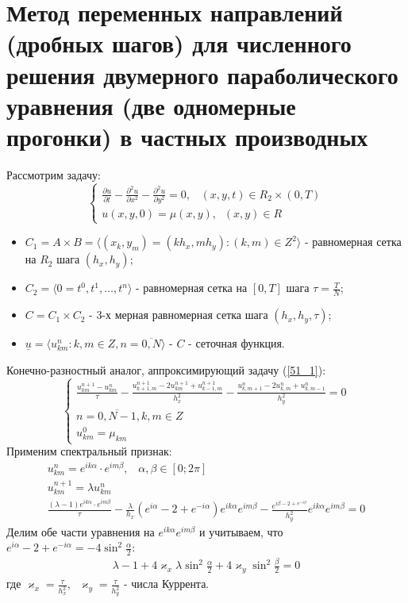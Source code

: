 \documentclass[__main__.tex]{subfiles}
\begin{document}
\section{Метод переменных направлений (дробных шагов) для численного решения двумерного параболического уравнения (две одномерные прогонки) в частных производных}

Рассмотрим задачу:
\begin{equation}
	\label{51_1}
	\begin{cases}
		\frac{\partial u}{\partial t}-\frac{\partial^2u}{\partial x^2}-\frac{\partial^2u}{\partial y^2} = 0,\;\;\;(x,y,t)\in R_2\times (0,T)\\
		u(x,y,0) = \mu(x,y),\;\;(x,y)\in R
	\end{cases}
\end{equation}
\begin{itemize}
	\item $C_1 = A\times B = \langle(x_k,y_m) = (kh_x,mh_y):(k,m)\in Z^2\rangle$ - равномерная сетка на $R_2$ шага $(h_x,h_y)$;
	\item $C_2 = \langle 0 = t^0,t^1,\dots,t^n\rangle$ - равномерная сетка на $[0,T]$ шага $\tau = \frac{T}{N}$;
	\item $C = C_1\times C_2$ - 3-х мерная равномерная сетка шага $(h_x,h_y,\tau)$;
	\item $\underline{u} = \langle u_{km}^n:k,m\in Z, n = \overline{0,N}\rangle$ - $C$ - сеточная функция.
\end{itemize} 
Конечно-разностный аналог, аппроксимирующий задачу (\ref{51_1}):
\begin{equation*}
	\begin{cases}
		\frac{u_{km}^{n+1}-u^n_{km}}{\tau}-\frac{u^{n+1}_{k+1,m}-2u_{km}^{n+1}+u_{k-1,m}^{n+1}}{h^2_x}-\frac{u^n_{k,m+1}-2u^n_{k,m}+u^n_{k,m-1}}{h^2_y} = 0\\
		n = \overline{0,N-1}, k,m\in Z\\
		u^0_{km} = \mu_{km}
	\end{cases}
\end{equation*}
Применим спектральный признак:
\begin{gather*}
	u^n_{km} = e^{ik\alpha}\cdot e^{im\beta},\;\;\;\alpha,\beta\in[0;2\pi]\\
	u_{km}^{n+1} = \lambda u^n_{km}\\
	\frac{(\lambda-1)e^{ik\alpha}\cdot e^{im\beta}}{\tau}-\frac{\lambda}{h_x}\left(e^{i\alpha}-2+e^{-i\alpha}\right)e^{ik\alpha}e^{im\beta}-\frac{e^{i\beta-2+e^{-i\beta}}}{h^2_y}e^{ik\alpha}e^{im\beta} = 0
\end{gather*}
Делим обе части уравнения на $e^{ik\alpha}e^{im\beta}$ и учитываем, что $e^{i\alpha}-2+e^{-i\alpha} = -4\sin^2\frac{\alpha}{2}$:
\begin{gather}
	\label{51_2}
	\lambda-1+4\varkappa_x\lambda \sin^2\frac{\alpha}{2}+4\varkappa_y\sin^2\frac{\beta}{2} = 0
\end{gather}
где $\varkappa_x = \frac{\tau}{h^2_x},\;\;\varkappa_y = \frac{\tau}{h^2_y}$ - числа Куррента.
\end{document}
